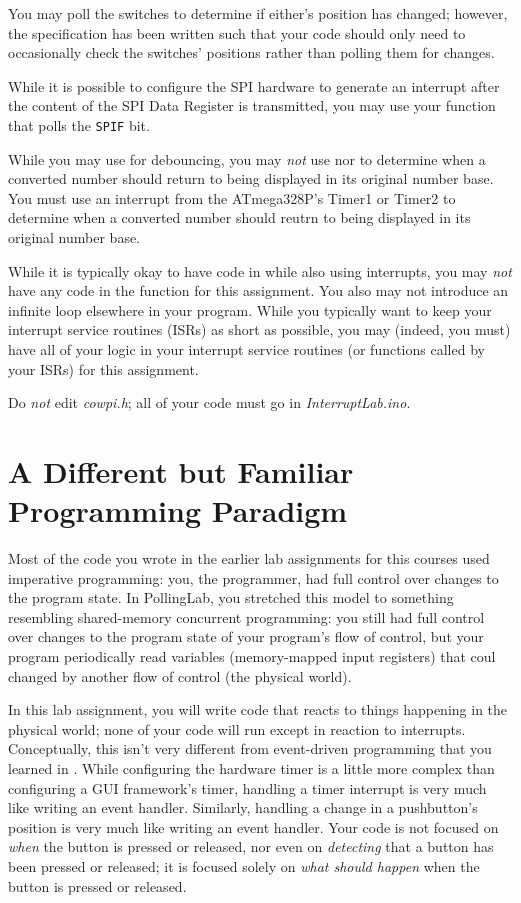 You may poll the switches to determine if either's position has changed;
however, the specification has been written such that your code should only
need to occasionally check the switches' positions rather than polling them for
changes.

While it is possible to configure the SPI hardware to generate an interrupt
after the content of the SPI Data Register is transmitted, you may use your
 function that polls the \texttt{SPIF} bit.

While you may use  for debouncing, you may \textit{not} use
 nor  to determine when a converted number
should return to being displayed in its original number base. You must use an
interrupt from the ATmega328P's Timer1 or Timer2 to determine when a converted
number should reutrn to being displayed in its original number base.

While it is typically okay to have code in  while also using
interrupts, you may \textit{not} have any code in the 
function for this assignment. You also may not introduce an infinite loop
elsewhere in your program. While you typically want to keep your interrupt
service routines (ISRs) as short as possible, you may (indeed, you must) have
all of your logic in your interrupt service routines (or functions called by
your ISRs) for this assignment.

Do \textit{not} edit \textit{cowpi.h}; all of your code must go in
\textit{InterruptLab.ino}.

\section{A Different but Familiar Programming Paradigm} \label{sec:Paradigm}

Most of the code you wrote in the earlier lab assignments for this courses used
imperative programming: you, the programmer, had full control over changes to
the program state. In PollingLab, you stretched this model to something
resembling shared-memory concurrent programming: you still had full control
over changes to the program state of your program's flow of control, but your
program periodically read variables (memory-mapped input registers) that coul
changed by another flow of control (the physical world).

In this lab assignment, you will write code that reacts to things happening in
the physical world; none of your code will run except in reaction to interrupts.
Conceptually, this isn't very different from event-driven programming that you
learned in \cstwo. While configuring the hardware timer is a little more complex
than configuring a GUI framework's timer, handling a timer interrupt is very
much like writing an  event handler. Similarly, handling
a change in a pushbutton's position is very much like writing an
 event handler. Your code is not focused on \textit{when}
the button is pressed or released, nor even on \textit{detecting} that a button
has been pressed or released; it is focused solely on \textit{what should happen}
when the button is pressed or released.

